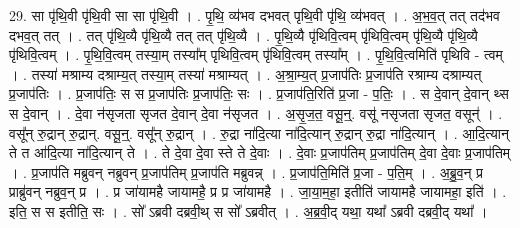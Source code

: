 \documentclass[17pt]{extarticle}
\begin{document}
29. सा पृ॑थि॒वी पृ॑थि॒वी सा सा पृ॑थि॒वी । . पृ॒थि॒ व्य॑भव दभवत् पृथि॒वी पृ॑थि॒ व्य॑भवत् । . अ॒भ॒व॒त् तत् तद॑भव दभव॒त् तत् । . तत् पृ॑थि॒व्यै पृ॑थि॒व्यै तत् तत् पृ॑थि॒व्यै । . पृ॒थि॒व्यै पृ॑थिवि॒त्वम् पृ॑थिवि॒त्वम् पृ॑थि॒व्यै पृ॑थि॒व्यै पृ॑थिवि॒त्वम् । . पृ॒थि॒वि॒त्वम् तस्या॒म् तस्या᳚म् पृथिवि॒त्वम् पृ॑थिवि॒त्वम् तस्या᳚म् । . पृ॒थि॒वि॒त्वमिति॑ पृथिवि - त्वम् । . तस्या॑ मश्राम्य दश्राम्य॒त् तस्या॒म् तस्या॑ मश्राम्यत् । . अ॒श्रा॒म्य॒त् प्र॒जाप॑तिः प्र॒जाप॑ति रश्राम्य दश्राम्यत् प्र॒जाप॑तिः । . प्र॒जाप॑तिः॒ स स प्र॒जाप॑तिः प्र॒जाप॑तिः॒ सः । . प्र॒जाप॑ति॒रिति॑ प्र॒जा - प॒तिः॒ । . स दे॒वान् दे॒वान् थ्स स दे॒वान् । . दे॒वा न॑सृजता सृजत दे॒वान् दे॒वा न॑सृजत । . अ॒सृ॒ज॒त॒ वसू॒न्॒. वसू॑ नसृजता सृजत॒ वसून्॑ । . वसू᳚न् रु॒द्रान् रु॒द्रान्. वसू॒न्॒. वसू᳚न् रु॒द्रान् । . रु॒द्रा ना॑दि॒त्या ना॑दि॒त्यान् रु॒द्रान् रु॒द्रा ना॑दि॒त्यान् । . आ॒दि॒त्यान् ते त आ॑दि॒त्या ना॑दि॒त्यान् ते । . ते दे॒वा दे॒वा स्ते ते दे॒वाः । . दे॒वाः प्र॒जाप॑तिम् प्र॒जाप॑तिम् दे॒वा दे॒वाः प्र॒जाप॑तिम् । . प्र॒जाप॑ति मब्रुवन् नब्रुवन् प्र॒जाप॑तिम् प्र॒जाप॑ति मब्रुवन्न् । . प्र॒जाप॑ति॒मिति॑ प्र॒जा - प॒ति॒म् । . अ॒ब्रु॒व॒न् प्र प्राब्रु॑वन् नब्रुव॒न् प्र । . प्र जा॑यामहै जायामहै॒ प्र प्र जा॑यामहै । . जा॒या॒म॒हा॒ इतीति॑ जायामहै जायामहा॒ इति॑ । . इति॒ स स इतीति॒ सः । . सो᳚ ऽब्रवी दब्रवी॒थ् स सो᳚ ऽब्रवीत् । . अ॒ब्र॒वी॒द् यथा॒ यथा᳚ ऽब्रवी दब्रवी॒द् यथा᳚ । \newline
\end{document}
